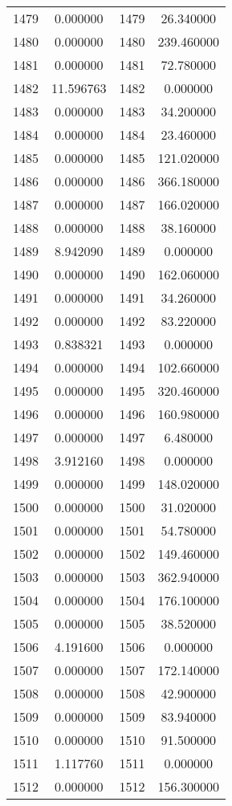 \documentclass[12pt]{article}
\begin{document}
\begin{longtable}{@{}cccc@{}}
1479 & 0.000000 & 1479 & 26.340000 \\
1480 & 0.000000 & 1480 & 239.460000 \\
1481 & 0.000000 & 1481 & 72.780000 \\
1482 & 11.596763 & 1482 & 0.000000 \\
1483 & 0.000000 & 1483 & 34.200000 \\
1484 & 0.000000 & 1484 & 23.460000 \\
1485 & 0.000000 & 1485 & 121.020000 \\
1486 & 0.000000 & 1486 & 366.180000 \\
1487 & 0.000000 & 1487 & 166.020000 \\
1488 & 0.000000 & 1488 & 38.160000 \\
1489 & 8.942090 & 1489 & 0.000000 \\
1490 & 0.000000 & 1490 & 162.060000 \\
1491 & 0.000000 & 1491 & 34.260000 \\
1492 & 0.000000 & 1492 & 83.220000 \\
1493 & 0.838321 & 1493 & 0.000000 \\
1494 & 0.000000 & 1494 & 102.660000 \\
1495 & 0.000000 & 1495 & 320.460000 \\
1496 & 0.000000 & 1496 & 160.980000 \\
1497 & 0.000000 & 1497 & 6.480000 \\
1498 & 3.912160 & 1498 & 0.000000 \\
1499 & 0.000000 & 1499 & 148.020000 \\
1500 & 0.000000 & 1500 & 31.020000 \\
1501 & 0.000000 & 1501 & 54.780000 \\
1502 & 0.000000 & 1502 & 149.460000 \\
1503 & 0.000000 & 1503 & 362.940000 \\
1504 & 0.000000 & 1504 & 176.100000 \\
1505 & 0.000000 & 1505 & 38.520000 \\
1506 & 4.191600 & 1506 & 0.000000 \\
1507 & 0.000000 & 1507 & 172.140000 \\
1508 & 0.000000 & 1508 & 42.900000 \\
1509 & 0.000000 & 1509 & 83.940000 \\
1510 & 0.000000 & 1510 & 91.500000 \\
1511 & 1.117760 & 1511 & 0.000000 \\
1512 & 0.000000 & 1512 & 156.300000 \\

\end{longtable}
\end{document}
